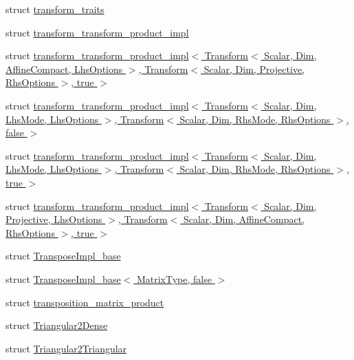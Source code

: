 \begin{DoxyCompactItemize}
\item 
struct \hyperlink{struct_eigen_1_1internal_1_1transform__traits}{transform\+\_\+traits}
\item 
struct \hyperlink{struct_eigen_1_1internal_1_1transform__transform__product__impl}{transform\+\_\+transform\+\_\+product\+\_\+impl}
\item 
struct \hyperlink{struct_eigen_1_1internal_1_1transform__transform__product__impl_3_01_transform_3_01_scalar_00_013384ded452302af9ec99c76aff6d09ab}{transform\+\_\+transform\+\_\+product\+\_\+impl$<$ Transform$<$ Scalar, Dim, Affine\+Compact, Lhs\+Options $>$, Transform$<$ Scalar, Dim, Projective, Rhs\+Options $>$, true $>$}
\item 
struct \hyperlink{struct_eigen_1_1internal_1_1transform__transform__product__impl_3_01_transform_3_01_scalar_00_01fe1fb77c9f6edc527bf418dd10ef65b9}{transform\+\_\+transform\+\_\+product\+\_\+impl$<$ Transform$<$ Scalar, Dim, Lhs\+Mode, Lhs\+Options $>$, Transform$<$ Scalar, Dim, Rhs\+Mode, Rhs\+Options $>$, false $>$}
\item 
struct \hyperlink{struct_eigen_1_1internal_1_1transform__transform__product__impl_3_01_transform_3_01_scalar_00_01d4d27ccbe125554f45d57d9ccad049c2}{transform\+\_\+transform\+\_\+product\+\_\+impl$<$ Transform$<$ Scalar, Dim, Lhs\+Mode, Lhs\+Options $>$, Transform$<$ Scalar, Dim, Rhs\+Mode, Rhs\+Options $>$, true $>$}
\item 
struct \hyperlink{struct_eigen_1_1internal_1_1transform__transform__product__impl_3_01_transform_3_01_scalar_00_01b95bea6ac8fd6454e5f4295a3f69392b}{transform\+\_\+transform\+\_\+product\+\_\+impl$<$ Transform$<$ Scalar, Dim, Projective, Lhs\+Options $>$, Transform$<$ Scalar, Dim, Affine\+Compact, Rhs\+Options $>$, true $>$}
\item 
struct \hyperlink{struct_eigen_1_1internal_1_1_transpose_impl__base}{Transpose\+Impl\+\_\+base}
\item 
struct \hyperlink{struct_eigen_1_1internal_1_1_transpose_impl__base_3_01_matrix_type_00_01false_01_4}{Transpose\+Impl\+\_\+base$<$ Matrix\+Type, false $>$}
\item 
struct \hyperlink{struct_eigen_1_1internal_1_1transposition__matrix__product}{transposition\+\_\+matrix\+\_\+product}
\item 
struct \hyperlink{struct_eigen_1_1internal_1_1_triangular2_dense}{Triangular2\+Dense}
\item 
struct \hyperlink{struct_eigen_1_1internal_1_1_triangular2_triangular}{Triangular2\+Triangular}
\item 

\end{DoxyCompactItemize}
